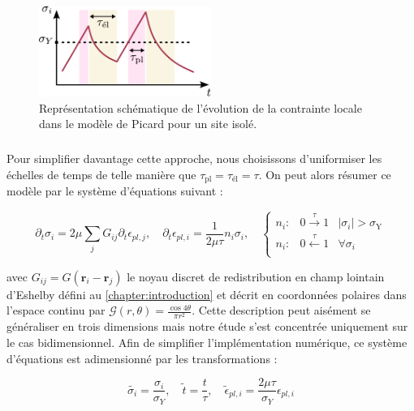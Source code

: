\begin{figure}[h]
	\centering
	\includegraphics[width=0.5\textwidth]{Chapitre4/Figures/Methode/PicardTau.pdf}
	\caption{Représentation schématique de l'évolution de la contrainte locale dans le modèle de Picard pour un site isolé.}
	\label{fig:rules}
\end{figure}

\subparagraph{}Pour simplifier davantage cette approche, nous choisissons d'uniformiser les échelles de temps de telle manière que $\tau_{\text{pl}} = \tau_{\text{él}} = \tau$. On peut alors résumer ce modèle par le système d'équations suivant :

\begin{equation}
	\partial_t\sigma_i = 2\mu\sum_{j}G_{ij}\partial_t \epsilon_{pl,j},\quad \partial_t \epsilon_{pl,i} = \frac{1}{2\mu\tau}n_i \sigma_i,\quad
	\left\{
    \begin{array}{lcc}
    n_i: & 0\xrightarrow{\tau}1 & |\sigma_i|>\sigma_\mathrm{Y} \\
    n_i: & 0\xleftarrow{\tau}1 & \forall \sigma_i\\
    \end{array}
    \right.
\label{eq:PicardRules}
\end{equation}

\noindent avec $G_{ij} = G(\mathbf{r}_i-\mathbf{r}_j)$ le noyau discret de redistribution en champ lointain d'Eshelby défini au \autoref{chapter:introduction} et décrit en coordonnées polaires dans l'espace continu par $\mathcal{G}(r,\theta) = \frac{\cos 4\theta}{\pi r^2}$. Cette description peut aisément se généraliser en trois dimensions mais notre étude s'est concentrée uniquement sur le cas bidimensionnel. Afin de simplifier l'implémentation numérique, ce système d'équations est adimensionné par les transformations :

\begin{equation}
	\tilde{\sigma_i} = \frac{\sigma_i}{\sigma_Y},\quad \tilde{t} = \frac{t}{\tau}, \quad \tilde{\epsilon}_{pl,i} = \frac{2\mu\tau}{\sigma_Y}\epsilon_{pl,i}
	\label{eq:PicardDim}
\end{equation}

